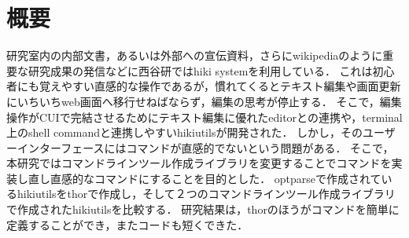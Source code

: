 \section{概要}
研究室内の内部文書，あるいは外部への宣伝資料，さらにwikipediaのように重要な研究成果の発信などに西谷研ではhiki systemを利用している．
これは初心者にも覚えやすい直感的な操作であるが，慣れてくるとテキスト編集や画面更新にいちいちweb画面へ移行せねばならず，編集の思考が停止する．
そこで，編集操作がCUIで完結させるためにテキスト編集に優れたeditorとの連携や，terminal上のshell commandと連携しやすいhikiutilsが開発された．
しかし，そのユーザーインターフェースにはコマンドが直感的でないという問題がある．
そこで，本研究ではコマンドラインツール作成ライブラリを変更することでコマンドを実装し直し直感的なコマンドにすることを目的とした．
optparseで作成されているhikiutilsをthorで作成し，そして２つのコマンドラインツール作成ライブラリで作成されたhikiutilsを比較する．
研究結果は，thorのほうがコマンドを簡単に定義することができ，またコードも短くできた．

